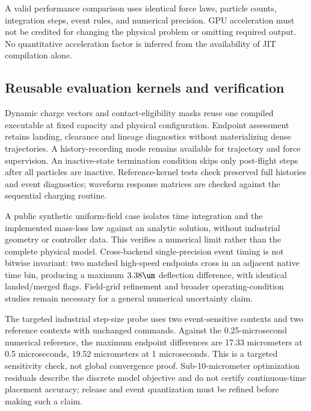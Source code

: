A valid performance comparison uses identical force laws, particle counts, integration steps, event rules, and numerical precision. GPU acceleration must not be credited for changing the physical problem or omitting required output. No quantitative acceleration factor is inferred from the availability of JIT compilation alone.

\subsection{Reusable evaluation kernels and verification}
Dynamic charge vectors and contact-eligibility masks reuse one compiled executable at fixed capacity and physical configuration. Endpoint assessment retains landing, clearance and lineage diagnostics without materializing dense trajectories. A history-recording mode remains available for trajectory and force supervision. An inactive-state termination condition skips only post-flight steps after all particles are inactive. Reference-kernel tests check preserved full histories and event diagnostics; waveform response matrices are checked against the sequential charging routine.

A public synthetic uniform-field case isolates time integration and the implemented mass-loss law against an analytic solution, without industrial geometry or controller data. This verifies a numerical limit rather than the complete physical model. Cross-backend single-precision event timing is not bitwise invariant: two matched high-speed endpoints cross in an adjacent native time bin, producing a maximum $3.38\um$ deflection difference, with identical landed/merged flags. Field-grid refinement and broader operating-condition studies remain necessary for a general numerical uncertainty claim.

The targeted industrial step-size probe uses two event-sensitive contexts and two reference contexts with unchanged commands. Against the 0.25-microsecond numerical reference, the maximum endpoint differences are 17.33 micrometers at 0.5 microseconds, 19.52 micrometers at 1 microseconds. This is a targeted sensitivity check, not global convergence proof. Sub-10-micrometer optimization residuals describe the discrete model objective and do not certify continuous-time placement accuracy; release and event quantization must be refined before making such a claim.
